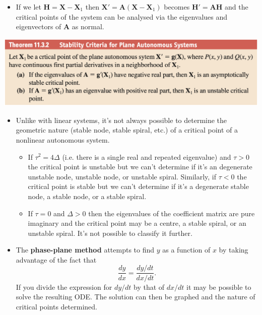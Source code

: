 \documentclass{article}
\begin{document}
\begin{itemize}
  \item If we let $\mathbf{H} = \mathbf{X} - \mathbf{X}_1$ then $\mathbf{X}' = \mathbf{A} (\mathbf{X} - \mathbf{X}_1)$ becomes $\mathbf{H}' = \mathbf{A} \mathbf{H}$ and the critical points of the system can be analysed via the eigenvalues and eigenvectors of $\mathbf{A}$ as normal.
\end{itemize}

\noindent
\includegraphics[scale=0.47]{stability-criteria-for-plane-systems}

\begin{itemize}
  \item Unlike with linear systems, it's not always possible to determine the geometric nature (stable node, stable spiral, etc.) of a critical point of a nonlinear autonomous system.

        \begin{itemize}
          \item If $\tau^2 = 4 \Delta$ (i.e. there is a single real and repeated eigenvalue) and $\tau > 0$ the critical point is unstable but we can't determine if it's an degenerate unstable node, unstable node, or unstable spiral. Similarly, if $\tau < 0$ the critical point is stable but we can't determine if it's a degenerate stable node, a stable node, or a stable spiral.

          \item If $\tau = 0$ and $\Delta > 0$ then the eigenvalues of the coefficient matrix are pure imaginary and the critical point may be a centre, a stable spiral, or an unstable spiral. It's not possible to classify it further.
        \end{itemize}

  \item The \textbf{phase-plane method} attempts to find $y$ as a function of $x$ by taking advantage of the fact that \[\frac{d y}{d x} = \frac{d y / d t}{d x / d t}.\] If you divide the expression for $d y / d t$ by that of $d x / d t$ it may be possible to solve the resulting ODE. The solution can then be graphed and the nature of critical points determined.
\end{itemize}
\end{document}
